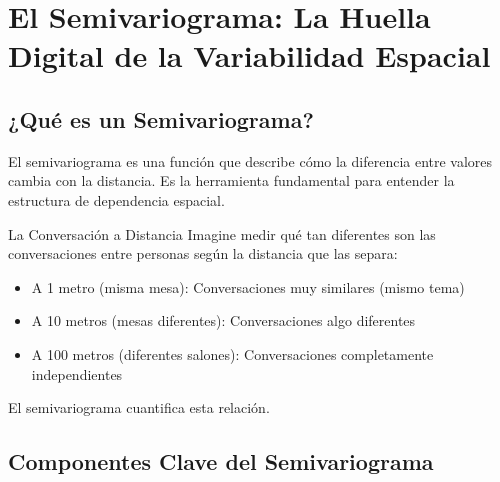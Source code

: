 \documentclass[12pt,a4paper]{article}
\begin{document}
\section{El Semivariograma: La Huella Digital de la Variabilidad Espacial}

\subsection{¿Qué es un Semivariograma?}

El semivariograma es una función que describe cómo la diferencia entre valores cambia con la distancia. Es la herramienta fundamental para entender la estructura de dependencia espacial.

\begin{analogia}{La Conversación a Distancia}
Imagine medir qué tan diferentes son las conversaciones entre personas según la distancia que las separa:
\begin{itemize}
    \item A 1 metro (misma mesa): Conversaciones muy similares (mismo tema)
    \item A 10 metros (mesas diferentes): Conversaciones algo diferentes
    \item A 100 metros (diferentes salones): Conversaciones completamente independientes
\end{itemize}
El semivariograma cuantifica esta relación.
\end{analogia}

\subsection{Componentes Clave del Semivariograma}
\end{document}
